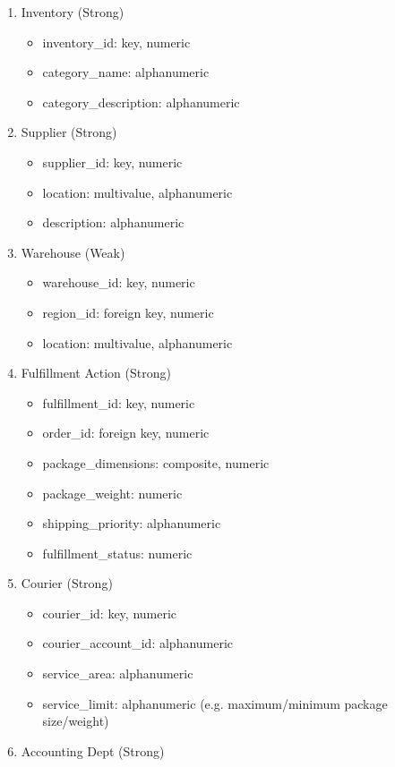 \begin{enumerate}
\item Inventory (Strong)
    \begin{itemize}
        \item inventory\_id: key, numeric
        \item category\_name: alphanumeric
        \item category\_description: alphanumeric
    \end{itemize}
\item Supplier (Strong)
    \begin{itemize}
        \item supplier\_id: key, numeric
        \item location: multivalue, alphanumeric
        \item description: alphanumeric
    \end{itemize}
\item Warehouse (Weak)
    \begin{itemize}
        \item warehouse\_id: key, numeric
        \item region\_id: foreign key, numeric
        \item location: multivalue, alphanumeric
    \end{itemize}
\item Fulfillment Action (Strong)
    \begin{itemize}
        \item fulfillment\_id: key, numeric
        \item order\_id: foreign key, numeric
        \item package\_dimensions: composite, numeric
        \item package\_weight: numeric
        \item shipping\_priority: alphanumeric
        \item fulfillment\_status: numeric
    \end{itemize}
\item Courier (Strong)
    \begin{itemize}
        \item courier\_id: key, numeric
        \item courier\_account\_id: alphanumeric
        \item service\_area: alphanumeric
        \item service\_limit: alphanumeric (e.g. maximum/minimum package size/weight)
    \end{itemize}
\item Accounting Dept (Strong)

\end{enumerate}
